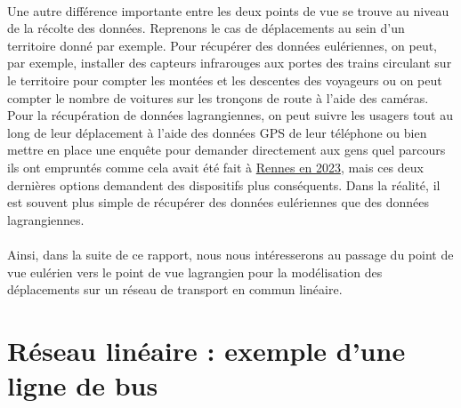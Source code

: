 \documentclass[12pt]{article}
\begin{document}
\\
Une autre différence importante entre les deux points de vue se trouve au niveau de la récolte des données. Reprenons le cas de déplacements au sein d'un territoire donné par exemple. Pour récupérer des données eulériennes, on peut, par exemple, installer des capteurs infrarouges aux portes des trains circulant sur le territoire pour compter les montées et les descentes des voyageurs ou on peut compter le nombre de voitures sur les tronçons de route à l'aide des caméras. Pour la récupération de données lagrangiennes, on peut suivre les usagers tout au long de leur déplacement à l'aide des données GPS de leur téléphone ou bien mettre en place une enquête pour demander directement aux gens quel parcours ils ont empruntés comme cela avait été fait à \href{https://metropole.rennes.fr/une-enquete-sur-les-deplacements-dans-le-reseau-star}{Rennes en 2023}, mais ces deux dernières options demandent des dispositifs plus conséquents. Dans la réalité, il est souvent plus simple de récupérer des données eulériennes que des données lagrangiennes.\\
\\
Ainsi, dans la suite de ce rapport, nous nous intéresserons au passage du point de vue eulérien vers le point de vue lagrangien pour la modélisation des déplacements sur un réseau de transport en commun linéaire.
\section{Réseau linéaire : exemple d'une ligne de bus}
\end{document}
